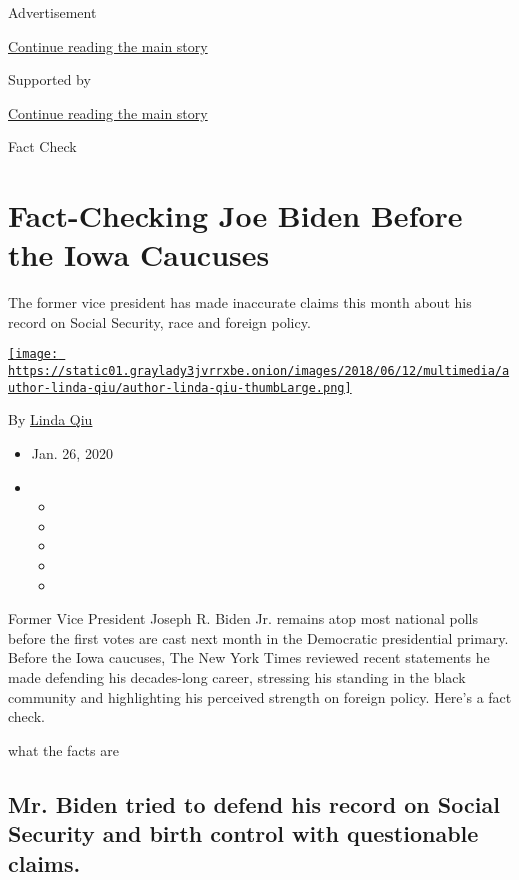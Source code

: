 Advertisement

\protect\hyperlink{after-top}{Continue reading the main story}

Supported by

\protect\hyperlink{after-sponsor}{Continue reading the main story}

Fact Check

\hypertarget{fact-checking-joe-biden-before-the-iowa-caucuses}{%
\section{Fact-Checking Joe Biden Before the Iowa
Caucuses}\label{fact-checking-joe-biden-before-the-iowa-caucuses}}

The former vice president has made inaccurate claims this month about
his record on Social Security, race and foreign policy.

\href{https://www.nytimes3xbfgragh.onion/by/linda-qiu}{\texttt{[image: https://static01.graylady3jvrrxbe.onion/images/2018/06/12/multimedia/author-linda-qiu/author-linda-qiu-thumbLarge.png]}}

By \href{https://www.nytimes3xbfgragh.onion/by/linda-qiu}{Linda Qiu}

\begin{itemize}
\item
  Jan. 26, 2020
\item
  \begin{itemize}
  \item
  \item
  \item
  \item
  \item
  \end{itemize}
\end{itemize}

Former Vice President Joseph R. Biden Jr. remains atop most national
polls before the first votes are cast next month in the Democratic
presidential primary. Before the Iowa caucuses, The New York Times
reviewed recent statements he made defending his decades-long career,
stressing his standing in the black community and highlighting his
perceived strength on foreign policy. Here's a fact check.

what the facts are

\hypertarget{mr-biden-tried-to-defend-his-record-on-social-security-and-birth-control-with-questionable-claims}{%
\subsection{Mr. Biden tried to defend his record on Social Security and
birth control with questionable
claims.}\label{mr-biden-tried-to-defend-his-record-on-social-security-and-birth-control-with-questionable-claims}}

